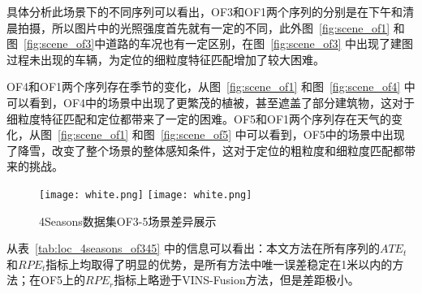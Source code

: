 具体分析此场景下的不同序列可以看出，OF3和OF1两个序列的分别是在下午和清晨拍摄，所以图片中的光照强度首先就有一定的不同，此外图~\ref{fig:scene_of1} 和图~\ref{fig:scene_of3}中道路的车况也有一定区别，在图~\ref{fig:scene_of3} 中出现了建图过程未出现的车辆，为定位的细粒度特征匹配增加了较大困难。

OF4和OF1两个序列存在季节的变化，从图~\ref{fig:scene_of1} 和图~\ref{fig:scene_of4} 中可以看到，OF4中的场景中出现了更繁茂的植被，甚至遮盖了部分建筑物，这对于细粒度特征匹配和定位都带来了一定的困难。OF5和OF1两个序列存在天气的变化，从图~\ref{fig:scene_of1} 和图~\ref{fig:scene_of5} 中可以看到，OF5中的场景中出现了降雪，改变了整个场景的整体感知条件，这对于定位的粗粒度和细粒度匹配都带来的挑战。

\begin{figure}
  \centering
  \texttt{[image: white.png]}
  \texttt{[image: white.png]}
  \caption{4Seasons数据集OF3-5场景差异展示}
  \label{fig:scene_of}
\end{figure}

从表~\ref{tab:loc_4seasons_of345} 中的信息可以看出：本文方法在所有序列的$ATE_t$和$RPE_t$指标上均取得了明显的优势，是所有方法中唯一误差稳定在1米以内的方法；在OF5上的$RPE_r$指标上略逊于VINS-Fusion方法，但是差距极小。

